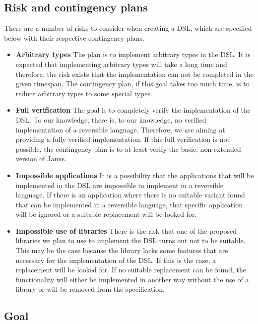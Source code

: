 \documentclass[12pt,a4paper]{article}
\begin{document}
\subsection{Risk and contingency plans}
There are a number of risks to consider when creating a DSL, which are specified below with their respective contingency plans.
\begin{itemize}
\item \textbf{Arbitrary types} The plan is to implement arbitrary types in the DSL. It is expected that implementing arbitrary types will take a long time and therefore, the risk exists that the implementation can not be completed in the given timespan. The contingency plan, if this goal takes too much time, is to reduce arbitrary types to some special types.
\item \textbf{Full verification} The goal is to completely verify the implementation of the DSL. To our knowledge, there is, to our knowledge, no verified implementation of a reversible language. Therefore, we are aiming at providing a fully verified implementation. If this full verification is not possible, the contingency plan is to at least verify the basic, non-extended version of Janus. 
\item \textbf{Impossible applications} It is a possibility that the applications that will be implemented in the DSL are impossible to implement in a reversible language. If there is an application where there is no suitable variant found that can be implemented in a reversible language, that specific application will be ignored or a suitable replacement will be looked for. 
\item \textbf{Impossible use of libraries} There is the risk that one of the proposed libraries we plan to use to implement the DSL turns out not to be suitable. This may be the case because the library lacks some features that are necessary for the implementation of the DSL. If this is the case, a replacement will be looked for. If no suitable replacement can be found, the functionality will either be implemented in another way without the use of a library or will be removed from the specification.
\end{itemize} 

\subsection{Goal}
\end{document}
